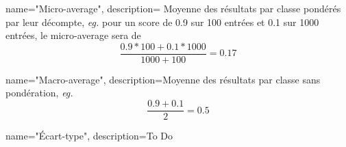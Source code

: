 
{
    name="Micro-average",
    description={
        Moyenne des résultats par classe pondérés par leur décompte, \textit{eg.} pour un score de 0.9 sur 100 entrées et 0.1 sur 1000 entrées, le micro-average sera de
        \begin{equation}
            \frac{0.9*100+0.1*1000}{1000+100}=0.17
        \end{equation}
    }
}

{
    name="Macro-average",
    description={Moyenne des résultats par classe sans pondération, \textit{eg.}
        \begin{equation}
            \frac{0.9+0.1}{2}=0.5
        \end{equation}
    }
}

{
    name="Écart-type",
    description={To Do}
}

